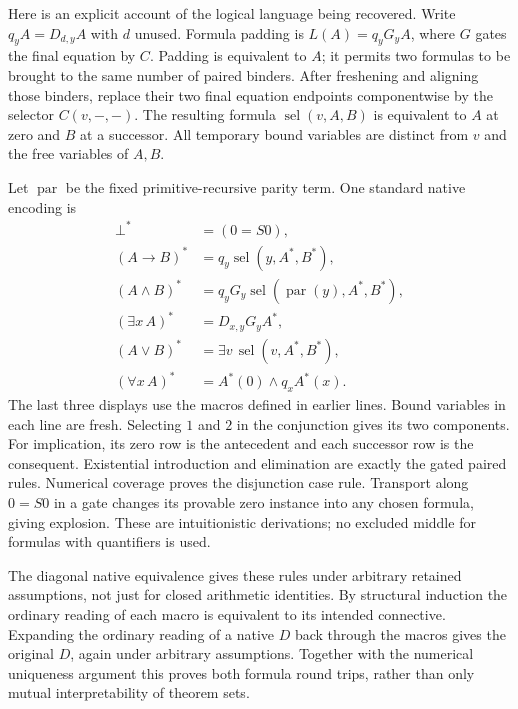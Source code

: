 Here is an explicit account of the logical language being recovered.
Write $q_yA=D_{d,y}A$ with $d$ unused. Formula padding is
$L(A)=q_yG_yA$, where $G$ gates the final equation by $C$. Padding is
equivalent to $A$; it permits two formulas to be brought to the same
number of paired binders. After freshening and aligning those binders,
replace their two final equation endpoints componentwise by the selector
$C(v,-,-)$. The resulting formula $\operatorname{sel}(v,A,B)$ is
equivalent to $A$ at zero and $B$ at a successor. All temporary bound
variables are distinct from $v$ and the free variables of $A,B$.

Let $\operatorname{par}$ be the fixed primitive-recursive parity term.
One standard native encoding is
\[
\begin{aligned}
\bot^*&=(0=S0),\\
(A\to B)^*&=q_y\operatorname{sel}(y,A^*,B^*),\\
(A\land B)^*&=q_yG_y\operatorname{sel}(\operatorname{par}(y),A^*,B^*),\\
(\exists x\,A)^*&=D_{x,y}G_yA^*,\\
(A\lor B)^*&=\exists v\,\operatorname{sel}(v,A^*,B^*),\\
(\forall x\,A)^*&=A^*(0)\land q_x A^*(x).
\end{aligned}
\]
The last three displays use the macros defined in earlier lines.
Bound variables in each line are fresh. Selecting $1$ and $2$ in the
conjunction gives its two components. For implication, its zero row is
the antecedent and each successor row is the consequent. Existential
introduction and elimination are exactly the gated paired rules. Numerical
coverage proves the disjunction case rule. Transport along $0=S0$ in
a gate changes its provable zero instance into any chosen formula,
giving explosion. These are intuitionistic derivations; no excluded
middle for formulas with quantifiers is used.

The diagonal native equivalence gives these rules under arbitrary retained
assumptions, not just for closed arithmetic identities. By structural
induction the ordinary reading of each macro is equivalent to its intended
connective. Expanding the ordinary reading of a native $D$ back through
the macros gives the original $D$, again under arbitrary assumptions.
Together with the numerical uniqueness argument this proves both formula
round trips, rather than only mutual interpretability of theorem sets.

